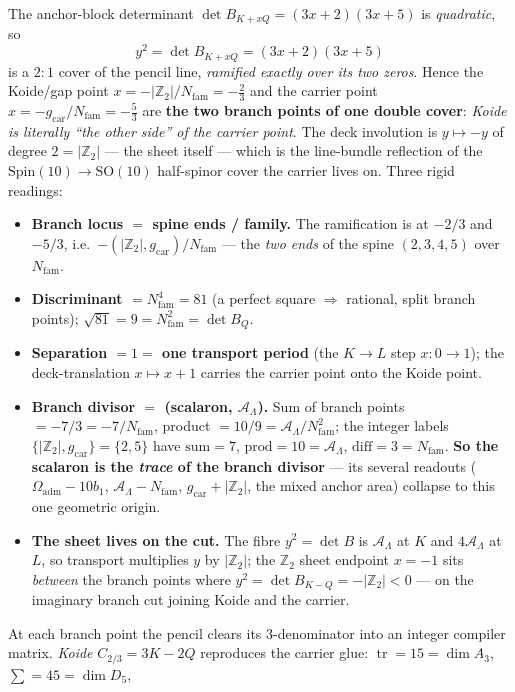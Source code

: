 \documentclass[11pt,a4paper]{article}
\newcommand{\gcar}{g_{\mathrm{car}}}
\newcommand{\Nfam}{N_{\mathrm{fam}}}
\newcommand{\Oadm}{\Omega_{\mathrm{adm}}}
\newcommand{\AL}{\mathcal A_\Lambda}
\newcommand{\Z}{\mathbb{Z}}
\theoremstyle{definition}
\begin{document}
\begin{keybox}
The anchor-block determinant $\det B_{K+xQ}=(3x+2)(3x+5)$ is \emph{quadratic}, so
\[
  \boxed{\ y^2=\det B_{K+xQ}=(3x+2)(3x+5)\ }
\]
is a $2{:}1$ cover of the pencil line, \emph{ramified exactly over its two zeros}. Hence the Koide/gap point
$x=-|\Z_2|/\Nfam=-\tfrac23$ and the carrier point $x=-\gcar/\Nfam=-\tfrac53$ are \textbf{the two branch points of
one double cover}: \emph{Koide is literally ``the other side'' of the carrier point}. The deck involution is
$y\mapsto-y$ of degree $2=|\Z_2|$ --- the sheet itself --- which is the line-bundle reflection of the
$\mathrm{Spin}(10)\!\to\!\mathrm{SO}(10)$ half-spinor cover the carrier lives on. Three rigid readings:
\begin{itemize}\setlength\itemsep{1pt}
  \item \textbf{Branch locus $=$ spine ends / family.} The ramification is at $-2/3$ and $-5/3$, i.e.\
  $-(|\Z_2|,\gcar)/\Nfam$ --- the \emph{two ends} of the spine $(2,3,4,5)$ over $\Nfam$.
  \item \textbf{Discriminant $=\Nfam^4=81$} (a perfect square $\Rightarrow$ rational, split branch points);
  $\sqrt{81}=9=\Nfam^2=\det B_Q$.
  \item \textbf{Separation $=1=$ one transport period} (the $K\!\to\!L$ step $x:0\!\to\!1$); the deck-translation
  $x\mapsto x+1$ carries the carrier point onto the Koide point.
  \item \textbf{Branch divisor $=$ (scalaron, $\AL$).} Sum of branch points $=-7/3=-7/\Nfam$, product $=10/9=\AL/\Nfam^2$;
  the integer labels $\{|\Z_2|,\gcar\}=\{2,5\}$ have $\mathrm{sum}=7$, $\mathrm{prod}=10=\AL$, $\mathrm{diff}=3=\Nfam$.
  \textbf{So the scalaron is the \emph{trace} of the branch divisor} --- its several readouts ($\Oadm{-}10b_1$,
  $\AL{-}\Nfam$, $\gcar{+}|\Z_2|$, the mixed anchor area) collapse to this one geometric origin.
  \item \textbf{The sheet lives on the cut.} The fibre $y^2{=}\det B$ is $\AL$ at $K$ and $4\AL$ at $L$, so transport
  multiplies $y$ by $|\Z_2|$; the $\Z_2$ sheet endpoint $x{=}{-}1$ sits \emph{between} the branch points where
  $y^2{=}\det B_{K-Q}{=}{-}|\Z_2|{<}0$ --- on the imaginary branch cut joining Koide and the carrier.
\end{itemize}
\noindent At each branch point the pencil clears its $3$-denominator into an integer compiler matrix.
\emph{Koide} $C_{2/3}=3K-2Q$ reproduces the carrier glue: $\operatorname{tr}=15=\dim A_3$, $\textstyle\sum=45=\dim D_5$,

\end{keybox}
\end{document}
